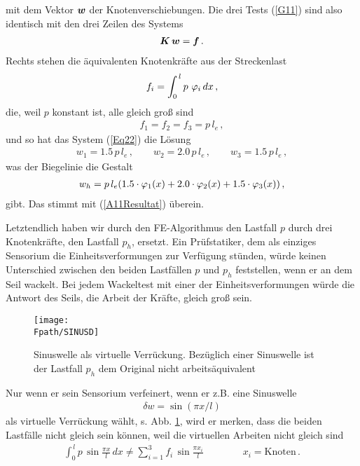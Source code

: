 mit dem Vektor $\mbox{\boldmath $w$}$ der Knotenverschiebungen. Die drei Tests (\ref{G11}) sind also identisch mit den drei Zeilen des Systems
\begin{align}\label{Eq22}
\mbox{\boldmath $K$}\,\mbox{\boldmath $w$} = \mbox{\boldmath $f$}\,.
\end{align}
Rechts stehen die \"{a}quivalenten Knotenkr\"{a}fte aus der Streckenlast
\begin{align}
 f_i = \int_0^{\,l} p\, \,\varphi_i\, dx\,,
\end{align}
die, weil $p$ konstant ist, alle gleich gro{\ss} sind
\begin{align}
f_1 = f_2 = f_3 = p \, l_{e} \,,
\end{align}
und so hat das System (\ref{Eq22}) die L\"{o}sung
\begin{align}
w_1 = 1.5\, p \, l_{e}\,, \qquad  w_2 = 2.0 \,p \, l_{e}\,, \qquad  w_3 = 1.5 \,p \,
l_{e}\,,
\end{align}
was der Biegelinie die Gestalt
\begin{align}
w_{h} =  p\, l_{e}(1.5 \cdot \varphi_1(x) + 2.0 \cdot \varphi_2(x) + 1.5 \cdot \varphi_3(x)) \,,
\end{align}
gibt. Das stimmt mit (\ref{A11Resultat}) \"{u}berein.


Letztendlich haben wir durch den FE-Algorithmus den Lastfall $p$ durch drei Knotenkr\"{a}fte, den Lastfall $p_h$, ersetzt. Ein Pr\"{u}fstatiker, dem als einziges  Sensorium  die Einheitsverformungen zur Verf\"{u}gung st\"{u}nden, w\"{u}rde keinen Unterschied zwischen den beiden Lastf\"{a}llen $p$ und $p_h$ feststellen, wenn er an dem Seil wackelt. Bei jedem Wackeltest mit einer der Einheitsverformungen w\"{u}rde die Antwort des Seils, die Arbeit der Kr\"{a}fte, gleich gro{\ss} sein.
\begin{figure}[tbp] \centering
\if {} \sidecaption \fi
\texttt{[image: \\Fpath/SINUSD]}
\caption{Sinuswelle als virtuelle Verr\"{u}ckung. Bez\"{u}glich einer Sinuswelle ist der
Lastfall $p_h$ dem Original nicht arbeits\"{a}quivalent} \label{Sinus}
\end{figure}%

Nur wenn er sein  Sensorium verfeinert, wenn er z.B. eine
Sinuswelle
\begin{align}
 \delta w = \sin (\pi x/l)
 \end{align}
als virtuelle Verr\"{u}ckung w\"{a}hlt, s. Abb. \ref{Sinus}, wird er merken, dass die beiden Lastf\"{a}lle nicht gleich
sein k\"{o}nnen, weil die virtuellen Arbeiten nicht gleich sind
\begin{align}
\int_0^{\,l} p \,\sin \frac{\pi x}{l} \,dx \neq \sum_{i = 1}^3 f_i \,\sin \frac{\pi x_i}{l}
\qquad\qquad x_i = \mbox{Knoten}\,.
\end{align}


